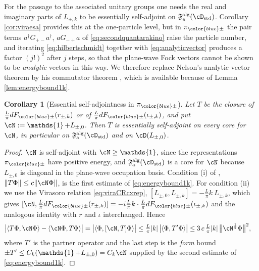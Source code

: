 \documentclass[a4paper, 11pt]{article}
\newcommand{\ua}{\textup a}
\newcommand{\fF}{\mathfrak{F}}\newcommand{\cF}{\mathcal{F}}\newcommand{\dF}{\mathds{F}}\newcommand{\sF}{\mathscr{F}}
\DeclareMathOperator{\1}{\mathds{1}}
\DeclareMathOperator{\std}{std}
\DeclareMathOperator{\alg}{alg}
\newtheorem{cor}[thm]{Corollary}
\begin{document}
For the passage to the associated unitary groups one needs the real and imaginary parts of $L_{\pm,k}$ to be essentially self-adjoint on $\fF^{\alg}_{\ua}(\cD_{\std})$. Corollary \ref{cor:viraesa} provides this at the one-particle level, but in $\pi_{{\color{blue}\pm}}$ the pair terms $a^{\dag}G_{+-}a^{\dag}$, $aG_{-+}a$ of \eqref{eq:secondquantarakino} raise the particle number, and iterating \eqref{eq:hilbertschmidt} together with \eqref{eq:analyticvector} produces a factor $(j!)^{2}$ after $j$ steps, so that the plane-wave Fock vectors cannot be shown to be \emph{analytic} vectors in this way. We therefore replace Nelson's analytic vector theorem by his commutator theorem \cite[Theorem X.37]{ReedMethodsOfModern2}, which is available because of Lemma \ref{lem:energybound1k}.

\begin{cor}[Essential self-adjointness in $\pi_{{\color{blue}\pm}}$]
\label{cor:viraesac}
Let $T$ be the closure of $\tfrac{L}{\pi}dF_{{\color{blue}\pm}}(r_{\pm,k})$ or of $\tfrac{L}{\pi}dF_{{\color{blue}\pm}}(\iota_{\pm,k})$, and put $\cN:=\1+L_{\pm,0}$. Then $T$ is essentially self-adjoint on every core for $\cN$, in particular on $\fF^{\alg}_{\ua}(\cD_{\std})$ and on $\cD(L_{\pm,0})$.
\end{cor}
\begin{proof}
$\cN$ is self-adjoint with $\cN\geq\1$, since the representations $\pi_{{\color{blue}\pm}}$ have positive energy, and $\fF^{\alg}_{\ua}(\cD_{\std})$ is a core for $\cN$ because $L_{\pm,0}$ is diagonal in the plane-wave occupation basis. Condition (i) of \cite[Theorem X.37]{ReedMethodsOfModern2}, $\|T\Phi\|\leq c\|\cN\Phi\|$, is the first estimate of \eqref{eq:energybound1k}. For condition (ii) we use the Virasoro relation \eqref{eq:viraCRcxrep}, $[L_{\pm,0},L_{\pm,k}] = -\tfrac{L}{\pi}k\!\ L_{\pm,k}$, which gives $[\cN,\tfrac{L}{\pi}dF_{{\color{blue}\pm}}(r_{\pm,k})] = -i\tfrac{L}{\pi}k\cdot\tfrac{L}{\pi}dF_{{\color{blue}\pm}}(\iota_{\pm,k})$ and the analogous identity with $r$ and $\iota$ interchanged. Hence
\begin{align*}
\big|\langle T\Phi,\cN\Phi\rangle-\langle\cN\Phi,T\Phi\rangle\big| & = \big|\langle\Phi,[\cN,T]\Phi\rangle\big| \leq \tfrac{L}{\pi}|k|\!\ \big|\langle\Phi,T'\Phi\rangle\big| \leq 3\!\ c\!\ \tfrac{L}{\pi}|k|\!\ \big\|\cN^{\frac{1}{2}}\Phi\big\|^{2},
\end{align*}
where $T'$ is the partner operator and the last step is the \emph{form} bound $\pm T'\leq C_{k}(\1+L_{\pm,0}) = C_{k}\cN$ supplied by the second estimate of \eqref{eq:energybound1k}.
\end{proof}
\end{document}

